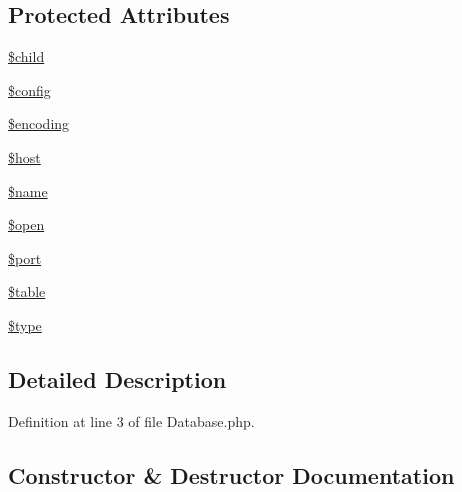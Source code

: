 \subsection*{Protected Attributes}
\begin{DoxyCompactItemize}
\item 
\hyperlink{class_database_a40410074f5960b0491d35e137147571c}{\$child}
\item 
\hyperlink{class_database_a49c7011be9c979d9174c52a8b83e5d8e}{\$config}
\item 
\hyperlink{class_database_aee271b7ce67fbe00b9976e6c347cbfbf}{\$encoding}
\item 
\hyperlink{class_database_a711797613cb863ca0756df789c396bf2}{\$host}
\item 
\hyperlink{class_database_ab2fc40d43824ea3e1ce5d86dee0d763b}{\$name}
\item 
\hyperlink{class_database_a4269f690c0554ecb1deec21b80f321dc}{\$open}
\item 
\hyperlink{class_database_aa0787efab4b22e8a212882f3409d4c77}{\$port}
\item 
\hyperlink{class_database_ae8876a14058f368335baccf35af4a22b}{\$table}
\item 
\hyperlink{class_database_a9a4a6fba2208984cabb3afacadf33919}{\$type}
\end{DoxyCompactItemize}


\subsection{Detailed Description}


Definition at line 3 of file Database.\+php.



\subsection{Constructor \& Destructor Documentation}
\hypertarget{class_database_a8621f88c8cc4a5d71e2856647c086438}{}
